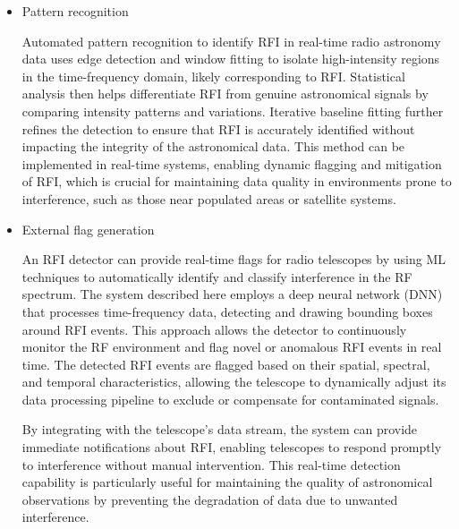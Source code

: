 \begin{itemize}
\item Pattern recognition

Automated pattern recognition to identify RFI in real-time radio astronomy data \citep{Winkel_2007} uses edge detection and window fitting to isolate high-intensity regions in the time-frequency domain, likely corresponding to RFI. Statistical analysis then helps differentiate RFI from genuine astronomical signals by comparing intensity patterns and variations. Iterative baseline fitting further refines the detection to ensure that RFI is accurately identified without impacting the integrity of the astronomical data. This method can be implemented in real-time systems, enabling dynamic flagging and mitigation of RFI, which is crucial for maintaining data quality in environments prone to interference, such as those near populated areas or satellite systems.

\item External flag generation

An RFI detector can provide real-time flags for radio telescopes by using ML techniques to automatically identify and classify interference in the RF spectrum. The system described here \citep{9111666} employs a deep neural network (DNN) that processes time-frequency data, detecting and drawing bounding boxes around RFI events. This approach allows the detector to continuously monitor the RF environment and flag novel or anomalous RFI events in real time. The detected RFI events are flagged based on their spatial, spectral, and temporal characteristics, allowing the telescope to dynamically adjust its data processing pipeline to exclude or compensate for contaminated signals.

By integrating with the telescope’s data stream, the system can provide immediate notifications about RFI, enabling telescopes to respond promptly to interference without manual intervention. This real-time detection capability is particularly useful for maintaining the quality of astronomical observations by preventing the degradation of data due to unwanted interference.



\end{itemize}

